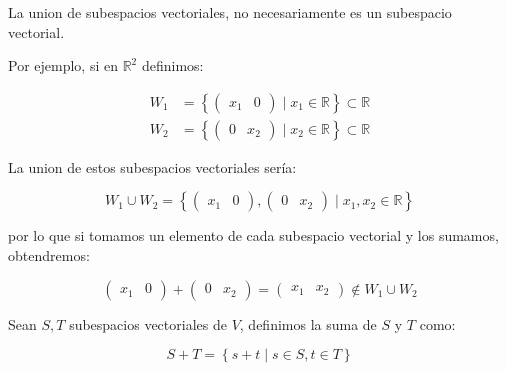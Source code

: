 		\begin{observacion}
			La union de subespacios vectoriales, no necesariamente es un subespacio vectorial.

			Por ejemplo, si en $\mathbb{R}^2$ definimos:

			\begin{align*}
				W_1 &= \left\{ \begin{pmatrix} x_1 & 0 \end{pmatrix} \mid x_1 \in \mathbb{R} \right\} \subset \mathbb{R} \\
				W_2 &= \left\{ \begin{pmatrix} 0 & x_2 \end{pmatrix} \mid x_2 \in \mathbb{R} \right\} \subset \mathbb{R}
			\end{align*}

			La union de estos subespacios vectoriales sería:

			\begin{equation*}
				W_1 \cup W_2 = \left\{ \begin{pmatrix} x_1 & 0 \end{pmatrix}, \begin{pmatrix} 0 & x_2 \end{pmatrix} \mid x_1, x_2 \in \mathbb{R} \right\}
			\end{equation*}

			por lo que si tomamos un elemento de cada subespacio vectorial y los sumamos, obtendremos:

			\begin{equation*}
				\begin{pmatrix} x_1 & 0 \end{pmatrix} + \begin{pmatrix} 0 & x_2 \end{pmatrix} = \begin{pmatrix} x_1 & x_2 \end{pmatrix} \notin W_1 \cup W_2
			\end{equation*}
		\end{observacion}

		\begin{definicion}
			Sean $S, T$ subespacios vectoriales de $V$, definimos la suma de $S$ y $T$ como:

			\begin{equation}
				S + T = \left\{ s + t \mid s \in S, t \in T \right\}
			\end{equation}
		\end{definicion}

